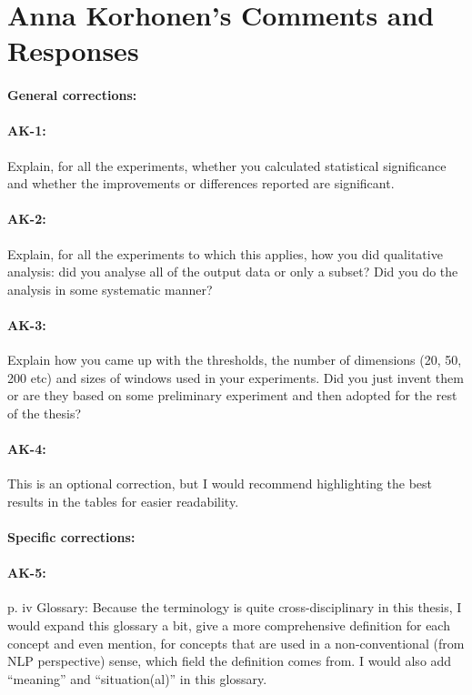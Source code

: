 \documentclass[11pt,a4paper]{article}
\begin{document}
\section{Anna Korhonen's Comments and Responses}

\paragraph{General corrections:}

\paragraph{AK-1:} Explain, for all the experiments, whether you calculated statistical significance and whether the improvements or differences reported are significant.

\paragraph{AK-2:} Explain, for all the experiments to which this applies, how you did qualitative analysis: did you analyse all of the output data or only a subset? Did you do the analysis in some systematic manner?

\paragraph{AK-3:} Explain how you came up with the thresholds, the number of dimensions (20, 50, 200 etc) and sizes of windows used in your experiments. Did you just invent them or are they based on some preliminary experiment and then adopted for the rest of the thesis?

\paragraph{AK-4:} This is an optional correction, but I would recommend highlighting the best results in the tables for easier readability.

\paragraph{Specific corrections:}

\paragraph{AK-5:} p. iv Glossary: Because the terminology is quite cross-disciplinary in this thesis, I would expand this glossary a bit, give a more comprehensive definition for each concept and even mention, for concepts that are used in a non-conventional (from NLP perspective) sense, which field the definition comes from. I would also add “meaning” and “situation(al)” in this glossary.
\end{document}
